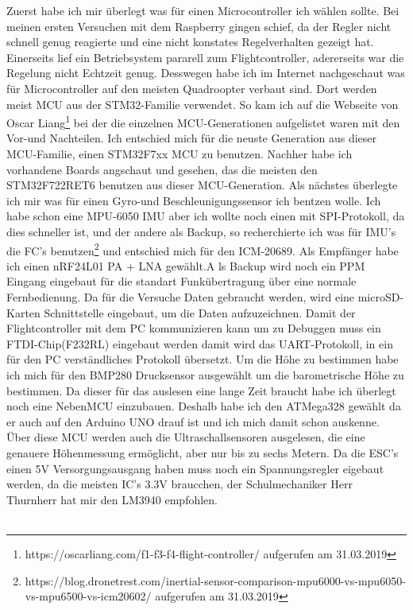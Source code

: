 \documentclass[12pt,a4paper, ngerman]{article}
\begin{document}
Zuerst habe ich mir überlegt was für einen Microcontroller ich wählen sollte. Bei meinen ersten Versuchen mit dem Raspberry gingen schief, da der Regler nicht schnell genug reagierte und eine nicht konstates Regelverhalten gezeigt hat. Einerseits lief ein Betriebsystem pararell zum Flightcontroller, adererseits war die Regelung nicht Echtzeit genug. Desswegen habe ich im Internet nachgeschaut was für Microcontroller auf den meisten Quadroopter verbaut sind. Dort werden  meist MCU aus der STM32-Familie verwendet. So kam ich auf die Webseite von Oscar Liang\footnote{\label{foot:1}https://oscarliang.com/f1-f3-f4-flight-controller/ aufgerufen am 31.03.2019} bei der die einzelnen MCU-Generationen aufgelistet waren mit den Vor-und Nachteilen. Ich entschied mich für die neuste Generation aus dieser MCU-Familie, einen STM32F7xx MCU zu benutzen. Nachher habe ich vorhandene Boards angschaut und gesehen, das die meisten den STM32F722RET6 benutzen aus dieser MCU-Generation. Als nächstes überlegte ich mir was für einen Gyro-und Beschleunigungssensor ich bentzen wolle. Ich habe schon eine MPU-6050 IMU aber ich wollte noch einen mit SPI-Protokoll, da dies schneller ist, und der andere als Backup, so recherchierte ich was für IMU's die FC's benutzen\footnote{\label{foot:2}https://blog.dronetrest.com/inertial-sensor-comparison-mpu6000-vs-mpu6050-vs-mpu6500-vs-icm20602/ aufgerufen am 31.03.2019} und entschied mich für den ICM-20689. Als Empfänger habe ich einen nRF24L01 PA + LNA gewählt.A ls Backup wird noch ein PPM Eingang eingebaut für die standart Funkübertragung über eine normale Fernbedienung. Da für die Versuche Daten gebraucht werden, wird eine microSD-Karten Schnittstelle eingebaut, um die Daten aufzuzeichnen. Damit der Flightcontroller mit dem PC kommunizieren kann um zu Debuggen muss ein FTDI-Chip(F232RL) eingebaut werden damit wird das UART-Protokoll, in ein für den PC verständliches Protokoll übersetzt. Um die Höhe zu bestimmen habe ich mich für den BMP280 Drucksensor ausgewählt um die barometrische Höhe zu bestimmen. Da dieser für das auslesen eine lange Zeit braucht habe ich überlegt noch eine NebenMCU einzubauen. Deshalb habe ich den ATMega328 gewählt da er auch auf den Arduino UNO drauf ist und ich mich damit schon auskenne. Über diese MCU werden auch die Ultraschallsensoren ausgelesen, die eine genauere Höhenmessung ermöglicht, aber nur bis zu sechs Metern. Da die ESC's einen 5V Versorgungsausgang haben muss noch ein Spannungsregler  eigebaut werden, da die meisten IC's 3.3V braucchen, der Schulmechaniker Herr Thurnherr hat mir den LM3940 empfohlen.\\ \\
\end{document}
